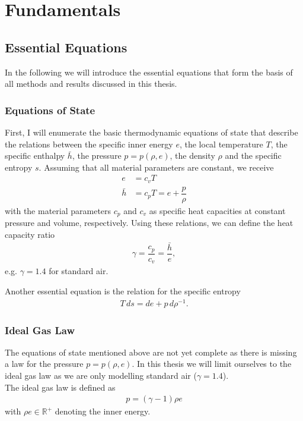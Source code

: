 \chapter{Fundamentals}
\label{fundamentals}
	\section{Essential Equations}
		In the following we will introduce the essential equations that form the basis of all methods and results discussed in this thesis. 
		\subsection{Equations of State}
		\label{EOS}
		First, I will enumerate the basic thermodynamic equations of state that describe the relations between the specific inner energy $e$, the local temperature $T$, the specific enthalpy $\bar{h}$, the pressure $p = p (\rho , e)$, the density $\rho$ and the specific entropy $s$.
		Assuming that all material parameters are constant, we receive
		\begin{align}
			e &= c_v T \\
			\bar{h} &= c_p T = e + \dfrac{p}{\rho}
		\end{align}
		with the material parameters $c_p$ and $c_v$ as specific heat capacities at constant pressure and volume, respectively. Using these relations, we can define the heat capacity ratio 
		\begin{align}
			\gamma = \dfrac{c_p}{c_v} = \dfrac{\bar{h}}{e}, 
		\end{align}
		e.g. $\gamma = 1.4$ for standard air.
		
		Another essential equation is the relation for the specific entropy 
		\begin{align}
			T \, ds = de + p \, d\rho^{-1}.
		\end{align}
		
		\subsection{Ideal Gas Law}
		The equations of state mentioned above are not yet complete as there is missing a law for the pressure $p = p (\rho , e)$. In this thesis we will limit ourselves to the ideal gas law as we are only modelling standard air ($\gamma = 1.4$). \\
		The ideal gas law is defined as
		\begin{align}
			p = (\gamma - 1) \rho e
		\end{align}
		with $\rho e \in \mathbb{R}^+$ denoting the inner energy. \\
		
